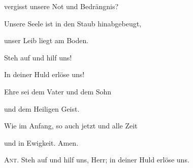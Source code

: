 vergisst unsere Not und Bedrängnis? 

 \noindent Unsere Seele ist in den Staub hinabgebeugt,~\GreStar{}~\nopagebreak

unser Leib liegt am Boden.

\noindent Steh auf und hilf uns!~\GreStar{}~\nopagebreak

In deiner Huld erlöse uns!

\noindent Ehre sei dem Vater und dem Sohn~\GreStar{}~\nopagebreak

und dem Heiligen Geist.

\noindent Wie im Anfang, so auch jetzt und alle Zeit~\GreStar{}~\nopagebreak

und in Ewigkeit. Amen.

\vspace{10pt}

\noindent \textsc{Ant.} Steh auf und hilf uns, Herr; in deiner Huld erlöse uns.
